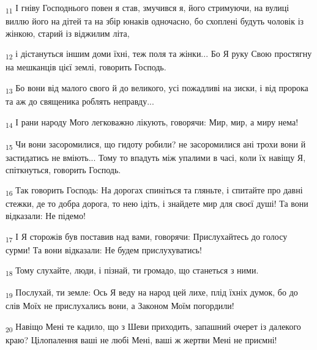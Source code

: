 \begin{tcolorbox}
\textsubscript{11} І гніву Господнього повен я став, змучився я, його стримуючи, на вулиці виллю його на дітей та на збір юнаків одночасно, бо схоплені будуть чоловік із жінкою, старий із віджилим літа,
\end{tcolorbox}
\begin{tcolorbox}
\textsubscript{12} і дістануться іншим доми їхні, теж поля та жінки... Бо Я руку Свою простягну на мешканців цієї землі, говорить Господь.
\end{tcolorbox}
\begin{tcolorbox}
\textsubscript{13} Бо вони від малого свого й до великого, усі пожадливі на зиски, і від пророка та аж до священика роблять неправду...
\end{tcolorbox}
\begin{tcolorbox}
\textsubscript{14} І рани народу Мого легковажно лікують, говорячи: Мир, мир, а миру нема!
\end{tcolorbox}
\begin{tcolorbox}
\textsubscript{15} Чи вони засоромилися, що гидоту робили? не засоромилися ані трохи вони й застидатись не вміють... Тому то впадуть між упалими в часі, коли їх навіщу Я, спіткнуться, говорить Господь.
\end{tcolorbox}
\begin{tcolorbox}
\textsubscript{16} Так говорить Господь: На дорогах спиніться та гляньте, і спитайте про давні стежки, де то добра дорога, то нею ідіть, і знайдете мир для своєї душі! Та вони відказали: Не підемо!
\end{tcolorbox}
\begin{tcolorbox}
\textsubscript{17} І Я сторожів був поставив над вами, говорячи: Прислухайтесь до голосу сурми! Та вони відказали: Не будем прислухуватись!
\end{tcolorbox}
\begin{tcolorbox}
\textsubscript{18} Тому слухайте, люди, і пізнай, ти громадо, що станеться з ними.
\end{tcolorbox}
\begin{tcolorbox}
\textsubscript{19} Послухай, ти земле: Ось Я веду на народ цей лихе, плід їхніх думок, бо до слів Моїх не прислухались вони, а Законом Моїм погордили!
\end{tcolorbox}
\begin{tcolorbox}
\textsubscript{20} Навіщо Мені те кадило, що з Шеви приходить, запашний очерет із далекого краю? Цілопалення ваші не любі Мені, ваші ж жертви Мені не приємні!
\end{tcolorbox}
